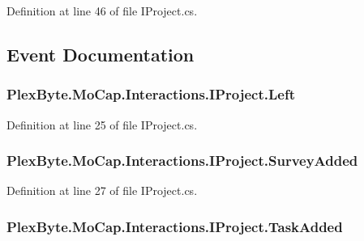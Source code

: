 Definition at line 46 of file I\+Project.\+cs.



\subsection{Event Documentation}
\subsubsection[{\texorpdfstring{Left}{Left}}]{ Plex\+Byte.\+Mo\+Cap.\+Interactions.\+I\+Project.\+Left}\hypertarget{interface_plex_byte_1_1_mo_cap_1_1_interactions_1_1_i_project_a5e5266a4b705cbe91b27b6ddd0d63713}{}\label{interface_plex_byte_1_1_mo_cap_1_1_interactions_1_1_i_project_a5e5266a4b705cbe91b27b6ddd0d63713}


Definition at line 25 of file I\+Project.\+cs.

\subsubsection[{\texorpdfstring{Survey\+Added}{SurveyAdded}}]{ Plex\+Byte.\+Mo\+Cap.\+Interactions.\+I\+Project.\+Survey\+Added}\hypertarget{interface_plex_byte_1_1_mo_cap_1_1_interactions_1_1_i_project_a4c42760e1b0fc98b56bbd55c1df01ea5}{}\label{interface_plex_byte_1_1_mo_cap_1_1_interactions_1_1_i_project_a4c42760e1b0fc98b56bbd55c1df01ea5}


Definition at line 27 of file I\+Project.\+cs.

\subsubsection[{\texorpdfstring{Task\+Added}{TaskAdded}}]{ Plex\+Byte.\+Mo\+Cap.\+Interactions.\+I\+Project.\+Task\+Added}\hypertarget{interface_plex_byte_1_1_mo_cap_1_1_interactions_1_1_i_project_aedc4e43b2efa4b28fab73d4f620a7533}{}\label{interface_plex_byte_1_1_mo_cap_1_1_interactions_1_1_i_project_aedc4e43b2efa4b28fab73d4f620a7533}



